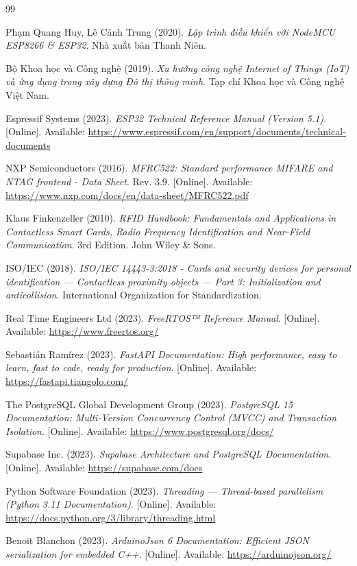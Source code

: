 \documentclass[12pt,a4paper]{report}
\begin{document}
\begin{thebibliography}{99}

Phạm Quang Huy, Lê Cảnh Trung (2020).
\textit{Lập trình điều khiển với NodeMCU ESP8266 \& ESP32}.
Nhà xuất bản Thanh Niên.

Bộ Khoa học và Công nghệ (2019).
\textit{Xu hướng công nghệ Internet of Things (IoT) và ứng dụng trong xây dựng Đô thị thông minh}.
Tạp chí Khoa học và Công nghệ Việt Nam.

Espressif Systems (2023).
\textit{ESP32 Technical Reference Manual (Version 5.1)}.
[Online]. Available: \url{https://www.espressif.com/en/support/documents/technical-documents}

NXP Semiconductors (2016).
\textit{MFRC522: Standard performance MIFARE and NTAG frontend - Data Sheet}.
Rev. 3.9.  
[Online]. Available: \url{https://www.nxp.com/docs/en/data-sheet/MFRC522.pdf}

Klaus Finkenzeller (2010).
\textit{RFID Handbook: Fundamentals and Applications in Contactless Smart Cards, Radio Frequency Identification and Near-Field Communication}.
3rd Edition. John Wiley \& Sons.

ISO/IEC (2018).
\textit{ISO/IEC 14443-3:2018 - Cards and security devices for personal identification — Contactless proximity objects — Part 3: Initialization and anticollision}.
International Organization for Standardization.

Real Time Engineers Ltd (2023).
\textit{FreeRTOS™ Reference Manual}.  
[Online]. Available: \url{https://www.freertos.org/}

Sebastián Ramírez (2023).
\textit{FastAPI Documentation: High performance, easy to learn, fast to code, ready for production}.  
[Online]. Available: \url{https://fastapi.tiangolo.com/}

The PostgreSQL Global Development Group (2023).
\textit{PostgreSQL 15 Documentation: Multi-Version Concurrency Control (MVCC) and Transaction Isolation}.  
[Online]. Available: \url{https://www.postgresql.org/docs/}

Supabase Inc. (2023).
\textit{Supabase Architecture and PostgreSQL Documentation}.  
[Online]. Available: \url{https://supabase.com/docs}

Python Software Foundation (2023).
\textit{Threading — Thread-based parallelism (Python 3.11 Documentation)}.  
[Online]. Available: \url{https://docs.python.org/3/library/threading.html}

Benoit Blanchon (2023).
\textit{ArduinoJson 6 Documentation: Efficient JSON serialization for embedded C++}.  
[Online]. Available: \url{https://arduinojson.org/}

\end{thebibliography}
\end{document}
